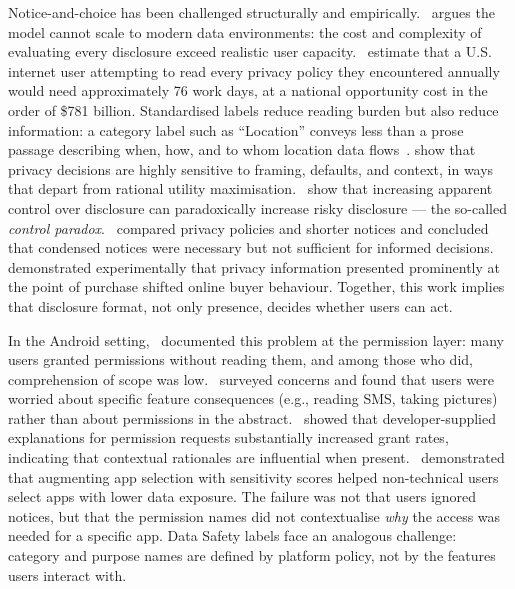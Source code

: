 \documentclass[11pt,a4paper]{article}
\begin{document}
Notice-and-choice has been challenged structurally and
empirically.~\citet{solove:2013} argues the model cannot scale to modern
data environments: the cost and complexity of evaluating every
disclosure exceed realistic user capacity.~\citet{mcdonald:cranor:2008}
estimate that a U.S. internet user attempting to read every privacy
policy they encountered annually would need approximately 76 work days,
at a national opportunity cost in the order of \$781 billion. Standardised
labels reduce reading burden but also reduce information: a category
label such as ``Location'' conveys less than a prose passage describing
when, how, and to whom location data flows~\citep{cranor:2012}.
\citet{acquisti:etal:2015,acquisti:etal:2017,acquisti:grossklags:2005}
show that privacy decisions are highly sensitive to framing, defaults,
and context, in ways that depart from rational utility
maximisation.~\citet{brandimarte:etal:2013} show that increasing apparent
control over disclosure can paradoxically increase risky disclosure ---
the so-called \emph{control paradox}.~\citet{jensen:potts:2004} compared
privacy policies and shorter notices and concluded that condensed
notices were necessary but not sufficient for informed
decisions.~\citet{tsai:etal:2011} demonstrated experimentally that
privacy information presented prominently at the point of purchase
shifted online buyer behaviour. Together, this work implies that
disclosure format, not only presence, decides whether users can act.

In the Android setting,~\citet{felt:etal:2012} documented this problem
at the permission layer: many users granted permissions without reading
them, and among those who did, comprehension of scope was
low.~\citet{felt:etal:2012b} surveyed concerns and found that users were
worried about specific feature consequences (e.g., reading SMS, taking
pictures) rather than about permissions in the
abstract.~\citet{tan:etal:2014} showed that developer-supplied
explanations for permission requests substantially increased grant rates,
indicating that contextual rationales are influential when
present.~\citet{liccardi:etal:2014} demonstrated that augmenting app
selection with sensitivity scores helped non-technical users select
apps with lower data exposure. The failure was not that users ignored
notices, but that the permission names did not contextualise
\emph{why} the access was needed for a specific app. Data Safety labels
face an analogous challenge: category and purpose names are defined by
platform policy, not by the features users interact with.
\end{document}
